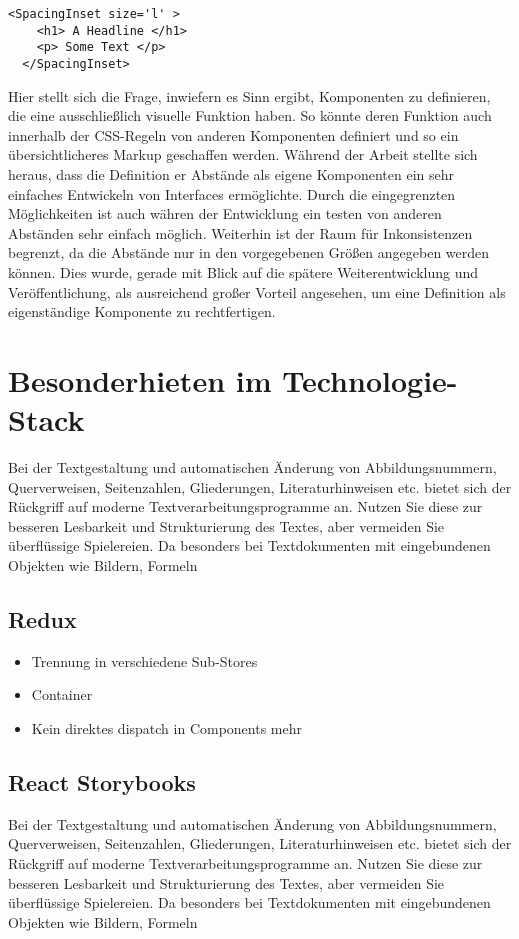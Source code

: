 \begin{lstlisting}[caption=Beispielhafte Verwendung einer Komponente für Abstände, label=ListingSpacingInset]
  <SpacingInset size='l' >
    <h1> A Headline </h1>
    <p> Some Text </p>
  </SpacingInset>
\end{lstlisting}

Hier stellt sich die Frage, inwiefern es Sinn ergibt, Komponenten zu definieren, die eine ausschließlich visuelle Funktion haben.
So könnte deren Funktion auch innerhalb der CSS-Regeln von anderen Komponenten definiert und so ein übersichtlicheres Markup geschaffen werden.
Während der Arbeit stellte sich heraus, dass die Definition er Abstände als eigene Komponenten ein sehr einfaches Entwickeln von Interfaces ermöglichte.  Durch die eingegrenzten Möglichkeiten ist auch währen der Entwicklung ein testen von anderen Abständen sehr einfach möglich.
Weiterhin ist der Raum für Inkonsistenzen begrenzt, da die Abstände nur in den vorgegebenen Größen angegeben werden können. Dies wurde, gerade mit Blick auf die spätere Weiterentwicklung und Veröffentlichung, als ausreichend großer Vorteil angesehen, um eine Definition als eigenständige Komponente zu rechtfertigen.

\section{Besonderhieten im Technologie-Stack}
Bei der Textgestaltung und automatischen Änderung von Abbildungsnummern, Querverweisen,
Seitenzahlen, Gliederungen, Literaturhinweisen etc. bietet sich der Rückgriff
auf moderne Textverarbeitungsprogramme an. Nutzen Sie diese zur besseren Lesbarkeit
und Strukturierung des Textes, aber vermeiden Sie überflüssige Spielereien. Da
besonders bei Textdokumenten mit eingebundenen Objekten wie Bildern, Formeln

\subsection{Redux}
\begin{itemize}
  \item Trennung in verschiedene Sub-Stores
  \item Container
  \item Kein direktes dispatch in Components mehr
\end{itemize}

\subsection{React Storybooks}
Bei der Textgestaltung und automatischen Änderung von Abbildungsnummern, Querverweisen,
Seitenzahlen, Gliederungen, Literaturhinweisen etc. bietet sich der Rückgriff
auf moderne Textverarbeitungsprogramme an. Nutzen Sie diese zur besseren Lesbarkeit
und Strukturierung des Textes, aber vermeiden Sie überflüssige Spielereien. Da
besonders bei Textdokumenten mit eingebundenen Objekten wie Bildern, Formeln

